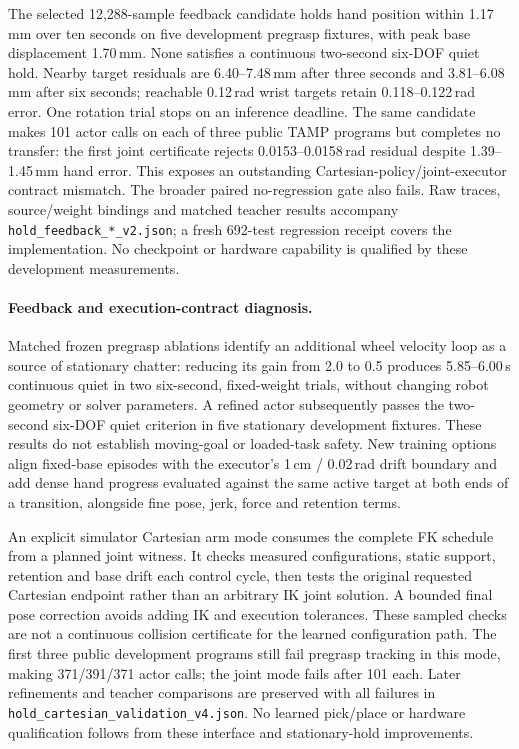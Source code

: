The selected 12,288-sample feedback candidate holds hand position within
1.17\,mm over ten seconds on five development pregrasp fixtures, with peak base
displacement 1.70\,mm. None satisfies a continuous two-second six-DOF quiet hold.
Nearby target residuals are 6.40--7.48\,mm after three seconds and
3.81--6.08\,mm after six seconds; reachable 0.12\,rad wrist targets retain
0.118--0.122\,rad error. One rotation trial stops on an inference deadline.
The same candidate makes 101 actor calls on each of three public TAMP programs
but completes no transfer: the first joint certificate rejects
0.0153--0.0158\,rad residual despite 1.39--1.45\,mm hand error. This exposes
an outstanding Cartesian-policy/joint-executor contract mismatch. The broader
paired no-regression gate also fails. Raw traces, source/weight bindings and
matched teacher results accompany \texttt{hold\_feedback\_*\_v2.json}; a fresh
692-test regression receipt covers the implementation. No checkpoint or
hardware capability is qualified by these development measurements.

\paragraph{Feedback and execution-contract diagnosis.}
Matched frozen pregrasp ablations identify an additional wheel velocity loop as
a source of stationary chatter: reducing its gain from 2.0 to 0.5 produces
5.85--6.00\,s continuous quiet in two six-second, fixed-weight trials, without
changing robot geometry or solver parameters. A refined actor subsequently
passes the two-second six-DOF quiet criterion in five stationary development
fixtures. These results do not establish moving-goal or loaded-task safety.
New training options align fixed-base episodes with the executor's
1\,cm / 0.02\,rad drift boundary and add dense hand progress evaluated against
the same active target at both ends of a transition, alongside fine pose,
jerk, force and retention terms.

An explicit simulator Cartesian arm mode consumes the complete FK schedule
from a planned joint witness. It checks measured configurations, static support,
retention and base drift each control cycle, then tests the original requested
Cartesian endpoint rather than an arbitrary IK joint solution. A bounded final
pose correction avoids adding IK and execution tolerances. These sampled checks
are not a continuous collision certificate for the learned configuration path.
The first three public development programs still fail pregrasp tracking in
this mode, making 371/391/371 actor calls; the joint mode fails after 101 each.
Later refinements and teacher comparisons are preserved with all failures in
\texttt{hold\_cartesian\_validation\_v4.json}. No learned pick/place or hardware
qualification follows from these interface and stationary-hold improvements.


